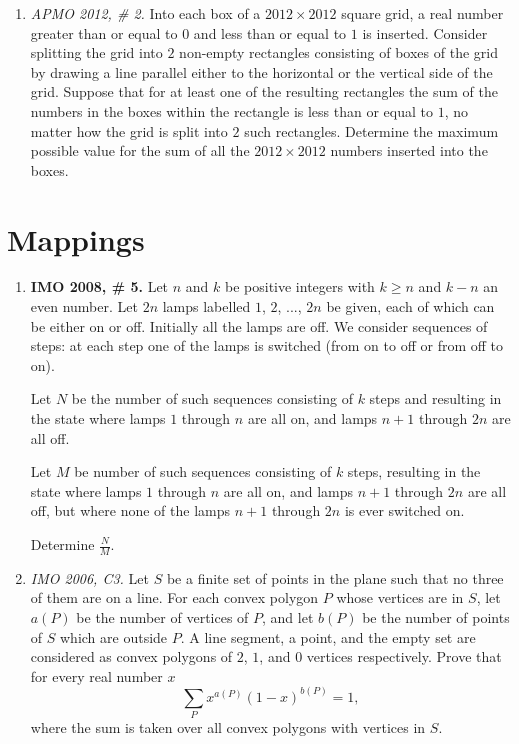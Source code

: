 \documentclass[11pt,a4paper]{article}
\begin{document}
\begin{enumerate}
\item\emph{APMO 2012, \# 2.} Into each box of a $ 2012 \times 2012 $ square grid, a real number greater than or equal to $ 0 $ and less than or equal to $ 1 $ is inserted. Consider splitting the grid into $2$ non-empty rectangles consisting of boxes of the grid by drawing a line parallel either to the horizontal or the vertical side of the grid. Suppose that for at least one of the resulting rectangles the sum of the numbers in the boxes within the rectangle is less than or equal to $ 1 $, no matter how the grid is split into $2$ such rectangles. Determine the maximum possible value for the sum of all the $ 2012 \times 2012 $ numbers inserted into the boxes.
\end{enumerate}

\section{Mappings}
\begin{enumerate}
\item\textbf {IMO 2008, \# 5.} Let $ n$ and $ k$ be positive integers with $ k \geq n$ and $ k - n$ an even number. Let $ 2n$ lamps labelled $ 1$, $ 2$, ..., $ 2n$ be given, each of which can be either on or off. Initially all the lamps are off. We consider sequences of steps: at each step one of the lamps is switched (from on to off or from off to on).

Let $ N$ be the number of such sequences consisting of $ k$ steps and resulting in the state where lamps $ 1$ through $ n$ are all on, and lamps $ n + 1$ through $ 2n$ are all off.

Let $ M$ be number of such sequences consisting of $ k$ steps, resulting in the state where lamps $ 1$ through $ n$ are all on, and lamps $ n + 1$ through $ 2n$ are all off, but where none of the lamps $ n + 1$ through $ 2n$ is ever switched on.

Determine $ \frac {N}{M}$.

\item\emph {IMO 2006, C3.} Let $ S$ be a finite set of points in the plane such that no three of them are on a line. For each convex polygon $ P$ whose vertices are in $ S$, let $ a(P)$ be the number of vertices of $ P$, and let $ b(P)$ be the number of points of $ S$ which are outside $ P$. A line segment, a point, and the empty set are considered as convex polygons of $ 2$, $ 1$, and $ 0$ vertices respectively. Prove that for every real number $ x$ \[\sum_{P}{x^{a(P)}(1 - x)^{b(P)}} = 1,\] where the sum is taken over all convex polygons with vertices in $ S$.
\end{enumerate}
\end{document}
